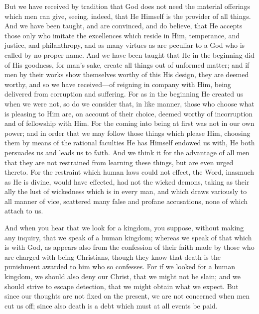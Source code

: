 
But we have received by tradition that God does not need the material offerings which men can give, seeing, indeed, that He Himself is the provider of all things. And we have been taught, and are convinced, and do believe, that He accepts those only who imitate the excellences which reside in Him, temperance, and justice, and philanthropy, and as many virtues as are peculiar to a God who is called by no proper name. And we have been taught that He in the beginning did of His goodness, for man’s sake, create all things out of unformed matter; and if men by their works show themselves worthy of this His design, they are deemed worthy, and so we have received—of reigning in company with Him, being delivered from corruption and suffering. For as in the beginning He created us when we were not, so do we consider that, in like manner, those who choose what is pleasing to Him are, on account of their choice, deemed worthy of incorruption and of fellowship with Him. For the coming into being at first was not in our own power; and in order that we may follow those things which please Him, choosing them by means of the rational faculties He has Himself endowed us with, He both persuades us and leads us to faith. And we think it for the advantage of all men that they are not restrained from learning these  things, but are even urged thereto. For the restraint which human laws could not effect, the Word, inasmuch as He is divine, would have effected, had not the wicked demons, taking as their ally the lust of wickedness which is in every man, and which draws variously to all manner of vice, scattered many false and profane accusations, none of which attach to us.


And when you hear that we look for a kingdom, you suppose, without making any inquiry, that we speak of a human kingdom; whereas we speak of that which is with God, as appears also from the confession of their faith made by those who are charged with being Christians, though they know that death is the punishment awarded to him who so confesses. For if we looked for a human kingdom, we should also deny our Christ, that we might not be slain; and we should strive to escape detection, that we might obtain what we expect. But since our thoughts are not fixed on the present, we are not concerned when men cut us off; since also death is a debt which must at all events be paid.

